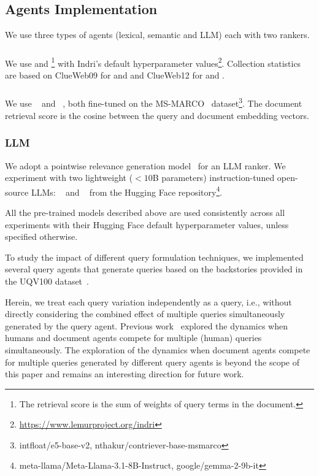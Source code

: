 \subsection{Agents Implementation}
\label{sec:agents-implementation}
% 
We use
three types of agents (lexical, semantic and LLM) each with two rankers.
\subsubsection*{\lexicalagent}
We use \bm and \tfidf\footnote{The retrieval score is the sum of \tfidf weights of query terms in the document.}  with Indri's default hyperparameter values\footnote{\url{https://www.lemurproject.org/indri}}.
Collection statistics are based on ClueWeb09 for \GregDataset and \NivDataset and ClueWeb12 for \MultiB and \MultiD.

\subsubsection*{\semanticagent}
We use \contriever~\cite{contriever} and \efive~\cite{e5}, both fine-tuned on the MS-MARCO~\cite{msmarco} dataset\footnote{intfloat/e5-base-v2, nthakur/contriever-base-msmarco}. The document retrieval score is the cosine between the query and document embedding vectors.

\subsubsection*{LLM} 
We adopt a pointwise relevance generation model~\cite{liang2022holistic} for an LLM ranker.
We experiment with two lightweight ($<10$B parameters) instruction-tuned open-source LLMs: \llamaWithVersion~\cite{dubey_llama_2024} and \gemmaWithVersion~\cite{gemma_team_gemma_nodate} from the Hugging Face repository\footnote{meta-llama/Meta-Llama-3.1-8B-Instruct, google/gemma-2-9b-it}. 

All the pre-trained models described above are used consistently across all experiments with their Hugging Face default hyperparameter values, unless specified otherwise.

To
study the impact of different query formulation techniques, we implemented several query agents that generate queries based on the backstories provided in the UQV100 dataset~\cite{uqv100}.


Herein, we treat each query variation independently as a query, i.e., without directly considering the combined effect of multiple queries simultaneously generated by the query agent.
Previous work~\cite{MultQueries} explored the dynamics when humans and document agents compete for multiple (human) queries simultaneously. 
The exploration of the dynamics when document agents compete for multiple queries generated by different query agents is beyond the scope of this paper and remains an interesting direction for future work. 


